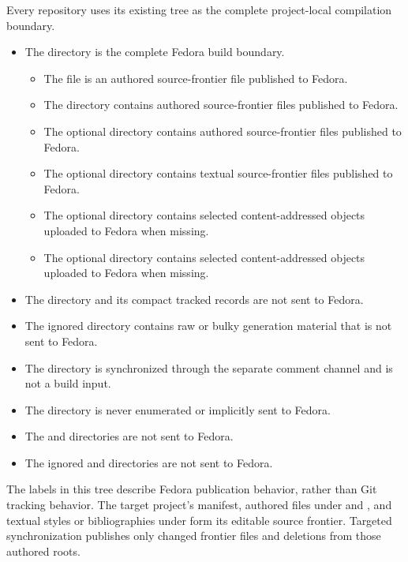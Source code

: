   {Every  repository uses its existing  tree as the complete project-local compilation boundary.
\begin{itemize}
\item The  directory is the complete Fedora build boundary.
\begin{itemize}
\item The  file is an authored source-frontier file published to Fedora.
\item The  directory contains authored source-frontier files published to Fedora.
\item The optional  directory contains authored source-frontier files published to Fedora.
\item The optional  directory contains textual source-frontier files published to Fedora.
\item The optional  directory contains selected content-addressed objects uploaded to Fedora when missing.
\item The optional  directory contains selected content-addressed objects uploaded to Fedora when missing.
\end{itemize}
\item The  directory and its compact tracked  records are not sent to Fedora.
\item The ignored  directory contains raw or bulky generation material that is not sent to Fedora.
\item The  directory is synchronized through the separate comment channel and is not a build input.
\item The  directory is never enumerated or implicitly sent to Fedora.
\item The  and  directories are not sent to Fedora.
\item The ignored  and  directories are not sent to Fedora.
\end{itemize}
The labels in this tree describe Fedora publication behavior, rather than Git tracking behavior.
The target project's manifest, authored files under  and , and textual styles or bibliographies under  form its editable source frontier.
Targeted synchronization publishes only changed frontier files and deletions from those authored roots.
}
